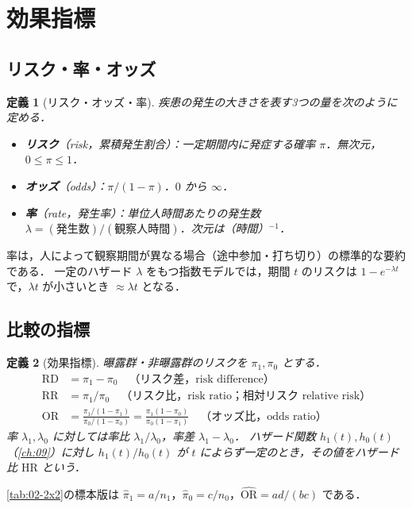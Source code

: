 \documentclass[a4paper,11pt,openany]{ltjsbook}
\newtheorem{teigi}{定義}[chapter]
\newcommand{\RR}{\mathrm{RR}}
\newcommand{\RD}{\mathrm{RD}}
\newcommand{\OR}{\mathrm{OR}}
\newcommand{\HR}{\mathrm{HR}}
\begin{document}
\section{効果指標}\label{sec:02-measure}
\subsection{リスク・率・オッズ}\label{subsec:02-risk}
\begin{teigi}[リスク・オッズ・率]\label{def:02-risk}
疾患の発生の大きさを表す3つの量を次のように定める．
\begin{itemize}
\item \textbf{リスク}（risk，累積発生割合）：一定期間内に発症する確率 $\pi$．無次元，$0\le\pi\le1$．
\item \textbf{オッズ}（odds）：$\pi/(1-\pi)$．$0$ から $\infty$．
\item \textbf{率}（rate，発生率）：単位人時間あたりの発生数 $\lambda=(\text{発生数})/(\text{観察人時間})$．次元は\mbox{（時間）$^{-1}$}．
\end{itemize}
\end{teigi}
率は，人によって観察期間が異なる場合（途中参加・打ち切り）の標準的な要約である．
一定のハザード $\lambda$ をもつ指数モデルでは，期間 $t$ のリスクは $1-e^{-\lambda t}$ で，$\lambda t$ が小さいとき $\approx\lambda t$ となる．

\subsection{比較の指標}\label{subsec:02-effect}
\begin{teigi}[効果指標]\label{def:02-effect}
曝露群・非曝露群のリスクを $\pi_1,\pi_0$ とする．
\begin{align*}
\RD&=\pi_1-\pi_0\quad\text{（リスク差，risk difference）}\\
\RR&=\pi_1/\pi_0\quad\text{（リスク比，risk ratio；相対リスク relative risk）}\\
\OR&=\frac{\pi_1/(1-\pi_1)}{\pi_0/(1-\pi_0)}=\frac{\pi_1(1-\pi_0)}{\pi_0(1-\pi_1)}\quad\text{（オッズ比，odds ratio）}
\end{align*}
率 $\lambda_1,\lambda_0$ に対しては率比 $\lambda_1/\lambda_0$，率差 $\lambda_1-\lambda_0$．
ハザード関数 $h_1(t),h_0(t)$（\cref{ch:09}）に対し $h_1(t)/h_0(t)$ が $t$ によらず一定のとき，その値をハザード比 $\HR$ という．
\end{teigi}
\cref{tab:02-2x2}の標本版は $\hat\pi_1=a/n_1$，$\hat\pi_0=c/n_0$，$\widehat{\OR}=ad/(bc)$ である．
\end{document}
